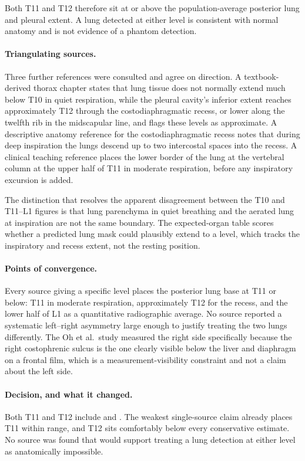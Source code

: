 Both T11 and T12 therefore sit at or above the population-average posterior
lung and pleural extent. A lung detected at either level is consistent with
normal anatomy and is not evidence of a phantom detection.

\paragraph{Triangulating sources.}
Three further references were consulted and agree on direction. A textbook-derived
thorax chapter states that lung tissue does not normally extend much below T10 in
quiet respiration, while the pleural cavity's inferior extent reaches
approximately T12 through the costodiaphragmatic recess, or lower along the
twelfth rib in the midscapular line, and flags these levels as approximate. A
descriptive anatomy reference for the costodiaphragmatic recess notes that during
deep inspiration the lungs descend up to two intercostal spaces into the recess.
A clinical teaching reference places the lower border of the lung at the
vertebral column at the upper half of T11 in moderate respiration, before any
inspiratory excursion is added.

The distinction that resolves the apparent disagreement between the T10 and
T11--L1 figures is that lung parenchyma in quiet breathing and the aerated lung
at inspiration are not the same boundary. The expected-organ table scores whether
a predicted lung mask could plausibly extend to a level, which tracks the
inspiratory and recess extent, not the resting position.

\paragraph{Points of convergence.}
Every source giving a specific level places the posterior lung base at T11 or
below: T11 in moderate respiration, approximately T12 for the recess, and the
lower half of L1 as a quantitative radiographic average. No source reported a
systematic left--right asymmetry large enough to justify treating the two lungs
differently. The Oh et al.\ study measured the right side specifically because
the right costophrenic sulcus is the one clearly visible below the liver and
diaphragm on a frontal film, which is a measurement-visibility constraint and
not a claim about the left side.

\paragraph{Decision, and what it changed.}
Both T11 and T12 include  and . The weakest
single-source claim already places T11 within range, and T12 sits comfortably
below every conservative estimate. No source was found that would support
treating a lung detection at either level as anatomically impossible.

